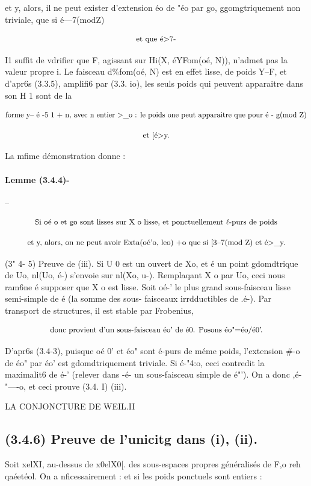\documentclass[11pt]{article}
\theoremstyle{remark}
\begin{document}
et y, alors, il ne peut exister d'extension éo de "éo par go, ggomgtriquement non triviale, que si é---7(modZ)

\[\text{\small et que é>7-}\]

I1 suffit de vdrifier que F, agissant sur Hi(X, éYFom(oé, N)), n'admet pas la valeur propre i. Le faisceau d\%fom(oé, N) est en effet lisse, de poids Y--F, et d'apr6s (3.3.5), amplifi6 par (3.3. io), les seuls poids qui peuvent apparaitre dans son H 1 sont de la

\[\text{\small forme y-- é -5 1 + n, avec n entier >\_o : le poids one peut apparaitre que pour é - g(mod Z)}\]

\[\text{\small et [é>y.}\]

La mfime démonstration donne :

\paragraph{Lemme (3.4.4)-}

--

\[\text{\small Si oé o et go sont lisses sur X o lisse, et ponctuellement \(\ell\)-purs de poids}\]

\[\text{\small et y, alors, on ne peut avoir Exta(oé'o, leo) +o que si [3--7(mod Z) et é>\_y.}\]

(3" 4- 5) Preuve de (iii). Si U 0 est un ouvert de Xo, et é un point gdomdtrique de Uo, nl(Uo, é-) s'envoie sur nl(Xo, u-). Remplaqant X o par Uo, ceci nous ram6ne é supposer que X o est lisse. Soit oé-' le plus grand sous-faisceau lisse semi-simple de é (la somme des sous- faisceaux irrdductibles de .é-). Par transport de structures, il est stable par Frobenius,

\[\text{\small donc provient d'un sous-faisceau éo' de é0. Posons éo"=éo/é0'.}\]

D'apr6s (3.4-3), puisque oé 0' et éo" sont é-purs de méme poids, l'extension \#-o de éo" par éo' est gdomdtriquement triviale. Si é-"4:o, ceci contredit la maximalit6 de é-' (relever dans -é- un sous-faisceau simple de é"'). On a donc ,é-"----o, et ceci prouve (3.4. I) (iii).

LA CONJONCTURE DE WEIL.II

\subsection*{(3.4.6) Preuve de l'unicitg dans (i), (ii).}

Soit xelXI, au-dessus de x0elX0[. des sous-espaces propres généralisés de F,o reh qaéetéol. On a nficessairement : et si les poids ponctuels sont entiers :
\end{document}
